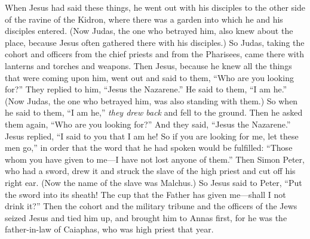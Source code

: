 \begin{biblechapter} %
 When Jesus had said these things, he went out with his disciples to the other side of the ravine of the Kidron, where there was a garden into which he and his disciples entered.
\verse (Now Judas, the one who betrayed him, also knew about the place, because Jesus often gathered there with his disciples.)
\verse So Judas, taking the cohort and officers from the chief priests and from the Pharisees, came there with lanterns and torches and weapons.
\verse Then Jesus, because he knew all the things that were coming upon him, went out and said to them, “Who are you looking for?”
\verse They replied to him, “Jesus the Nazarene.” He said to them, “I am he.” (Now Judas, the one who betrayed him, was also standing with them.)
\verse So when he said to them, “I am he,” \textit{they drew back} and fell to the ground.
\verse Then he asked them again, “Who are you looking for?” And they said, “Jesus the Nazarene.”
\verse Jesus replied, “I said to you that I am he! So if you are looking for me, let these men go,”
\verse in order that the word that he had spoken would be fulfilled: “Those whom you have given to me—I have not lost anyone of them.”
\verse Then Simon Peter, who had a sword, drew it and struck the slave of the high priest and cut off his right ear. (Now the name of the slave was Malchus.)
\verse So Jesus said to Peter, “Put the sword into its sheath! The cup that the Father has given me—shall I not drink it?”
 Then the cohort and the military tribune and the officers of the Jews seized Jesus and tied him up,
\verse and brought him to Annas first, for he was the father-in-law of Caiaphas, who was high priest that year.

\end{biblechapter}
